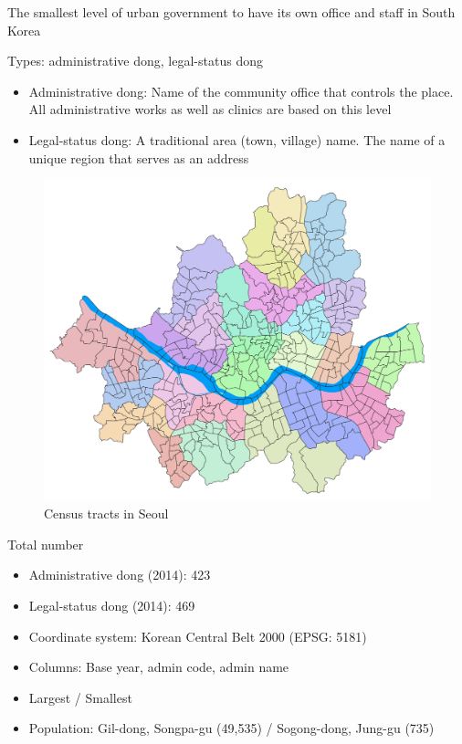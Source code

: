 \documentclass[]{book}
\providecommand{\tightlist}{%
  \setlength{\itemsep}{0pt}\setlength{\parskip}{0pt}}
\begin{document}
The smallest level of urban government to have its own office and staff
in South Korea

Types: administrative dong, legal-status dong

\begin{itemize}
\tightlist
\item
  Administrative dong: Name of the community office that controls the
  place. All administrative works as well as clinics are based on this
  level
\item
  Legal-status dong: A traditional area (town, village) name. The name
  of a unique region that serves as an address
\end{itemize}

\begin{figure}

{\centering \includegraphics[width=18.39in]{images/04_dong} 

}

\caption{\label{fig:figs}Census tracts in Seoul}\label{fig:unnamed-chunk-4}
\end{figure}

Total number

\begin{itemize}
\tightlist
\item
  Administrative dong (2014): 423
\item
  Legal-status dong (2014): 469
\item
  Coordinate system: Korean Central Belt 2000 (EPSG: 5181)
\item
  Columns: Base year, admin code, admin name
\item
  Largest / Smallest
\item
  Population: Gil-dong, Songpa-gu (49,535) / Sogong-dong, Jung-gu (735)
\end{itemize}
\end{document}
